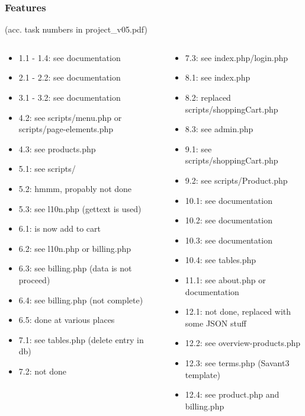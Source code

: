 \begin{frame}
\frametitle{Features}
%
(acc. task numbers in project\_v05.pdf)
%
\begin{columns}[c]
\column{2.3in}
%
\begin{scriptsize}
\begin{itemize}
  \item 1.1 - 1.4: see documentation
  \item 2.1 - 2.2: see documentation
  \item 3.1 - 3.2: see documentation
  \item 4.2: see scripts/menu.php or scripts/page-elements.php
  \item 4.3: see products.php
  \item 5.1: see scripts/
  \item 5.2: hmmm, propably not done
  \item 5.3: see l10n.php (gettext is used)
  \item 6.1: is now add to cart
  \item 6.2: see l10n.php or billing.php
  \item 6.3: see billing.php (data is not proceed)
  \item 6.4: see billing.php (not complete)
  \item 6.5: done at various places
  \item 7.1: see tables.php (delete entry in db)
  \item 7.2: not done

\end{itemize}
\end{scriptsize}

\column{2.3in}
%
\begin{scriptsize}
\begin{itemize}
  \item 7.3: see index.php/login.php
  \item 8.1: see index.php
  \item 8.2: replaced scripts/shoppingCart.php
  \item 8.3: see admin.php 
  \item 9.1: see scripts/shoppingCart.php
  \item 9.2: see scripts/Product.php
  \item 10.1: see documentation
  \item 10.2: see documentation
  \item 10.3: see documentation
  \item 10.4: see tables.php
  \item 11.1: see about.php or documentation
  \item 12.1: not done, replaced with some JSON stuff
  \item 12.2: see overview-products.php
  \item 12.3: see terms.php (Savant3 template)
  \item 12.4: see product.php and billing.php
\end{itemize}
\end{scriptsize}
%
\end{columns}
%
\end{frame}
